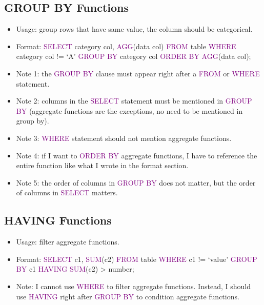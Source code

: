 \documentclass[a4paper]{article}
\begin{document}
\subsection{GROUP BY Functions}
\begin{itemize}
  \item Usage: group rows that have same value, the column should be categorical.
  \item Format: \textcolor{purple}{SELECT} category col, \textcolor{purple}{AGG}(data col) \textcolor{purple}{FROM} table \textcolor{purple}{WHERE} category col != `A' \textcolor{purple}{GROUP BY} category col \textcolor{purple}{ORDER BY AGG}(data col);
  \item Note 1: the \textcolor{purple}{GROUP BY} clause must appear right after a \textcolor{purple}{FROM} or \textcolor{purple}{WHERE} statement.
  \item Note 2: columns in the \textcolor{purple}{SELECT} statement must be mentioned in \textcolor{purple}{GROUP BY} (aggregate functions are the exceptions, no need to be mentioned in group by).
  \item Note 3: \textcolor{purple}{WHERE} statement should not mention aggregate functions.
  \item Note 4: if I want to \textcolor{purple}{ORDER BY} aggregate functions, I have to reference the entire function like what I wrote in the format section.
  \item Note 5: the order of columns in \textcolor{purple}{GROUP BY} does not matter, but the order of columns in \textcolor{purple}{SELECT} matters.
\end{itemize}

\subsection{HAVING Functions}
\begin{itemize}
  \item Usage: filter aggregate functions.
  \item Format: \textcolor{purple}{SELECT} c1, \textcolor{purple}{SUM}(c2) \textcolor{purple}{FROM} table \textcolor{purple}{WHERE} c1 != `value' \textcolor{purple}{GROUP BY} c1 \textcolor{purple}{HAVING} \textcolor{purple}{SUM}(c2) > number;
  \item Note: I cannot use \textcolor{purple}{WHERE} to filter aggregate functions. Instead, I should use \textcolor{purple}{HAVING} right after \textcolor{purple}{GROUP BY} to condition aggregate functions.
\end{itemize}
\end{document}
